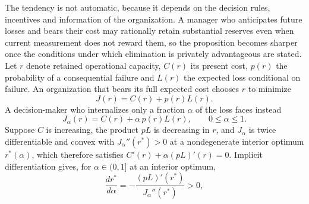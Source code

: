 \documentclass[12pt]{article}
\begin{document}
The tendency is not automatic, because it depends on the decision rules, incentives and information of the organization. A manager who anticipates future losses and bears their cost may rationally retain substantial reserves even when current measurement does not reward them, so the proposition becomes sharper once the conditions under which elimination is privately advantageous are stated. Let $r$ denote retained operational capacity, $C(r)$ its present cost, $p(r)$ the probability of a consequential failure and $L(r)$ the expected loss conditional on failure. An organization that bears its full expected cost chooses $r$ to minimize
\begin{equation}
J(r) = C(r) + p(r)L(r) .
\end{equation}
A decision-maker who internalizes only a fraction $\alpha$ of the loss faces instead
\begin{equation}
J_{\alpha}(r) = C(r) + \alpha\, p(r)L(r), \qquad 0 \leq \alpha \leq 1 .
\end{equation}
Suppose $C$ is increasing, the product $pL$ is decreasing in $r$, and $J_{\alpha}$ is twice differentiable and convex with $J_{\alpha}''(r^{*}) > 0$ at a nondegenerate interior optimum $r^{*}(\alpha)$, which therefore satisfies $C'(r) + \alpha (pL)'(r) = 0$. Implicit differentiation gives, for $\alpha \in (0,1]$ at an interior optimum,
\begin{equation}
\frac{d r^{*}}{d\alpha} = - \frac{(pL)'(r^{*})}{J_{\alpha}''(r^{*})} > 0 ,
\end{equation}
\end{document}
